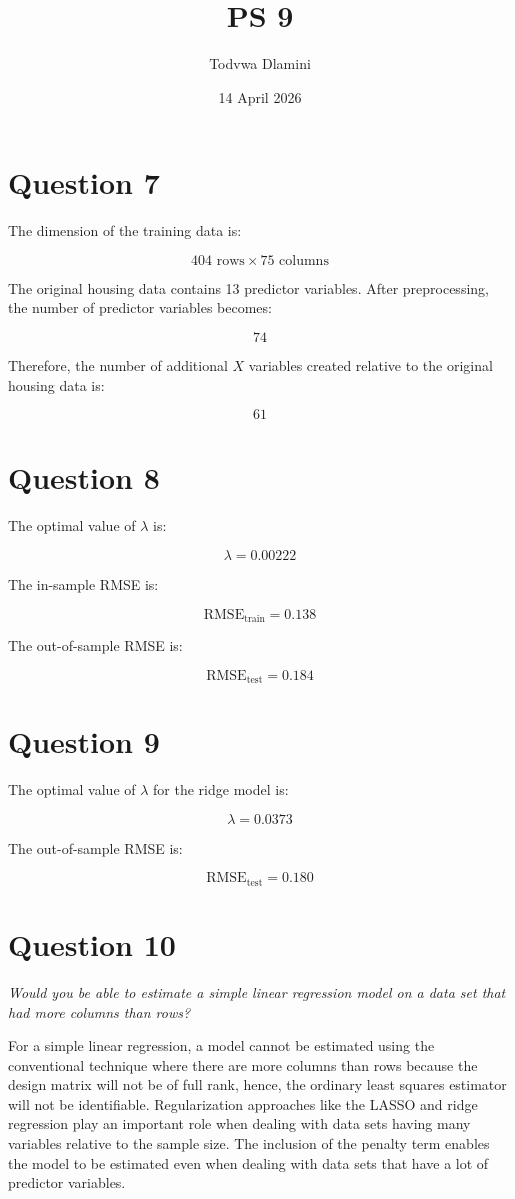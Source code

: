 \documentclass{article}
\title{PS 9}
\author{Todvwa Dlamini}
\date{14 April 2026}
\begin{document}
\maketitle

\section*{Question 7}

The dimension of the training data is:

\[
404 \text{ rows} \times 75 \text{ columns}
\]

The original housing data contains 13 predictor variables. After preprocessing, the number of predictor variables becomes:

\[
74
\]

Therefore, the number of additional $X$ variables created relative to the original housing data is:

\[
61
\]


\section*{Question 8}

The optimal value of $\lambda$ is:

\[
\lambda = 0.00222
\]

The in-sample RMSE is:

\[
\text{RMSE}_{\text{train}} = 0.138
\]

The out-of-sample RMSE is:

\[
\text{RMSE}_{\text{test}} = 0.184
\]


\section*{Question 9}

The optimal value of $\lambda$ for the ridge model is:

\[
\lambda = 0.0373
\]

The out-of-sample RMSE is:

\[
\text{RMSE}_{\text{test}} = 0.180
\]

\section*{Question 10}

\textit{Would you be able to estimate a simple linear regression model on a data set that had more columns than rows?}

\medskip
For a simple linear regression, a model cannot be estimated using the conventional technique where there are more columns than rows because the design matrix will not be of full rank, hence, the ordinary least squares estimator will not be identifiable. Regularization approaches like the LASSO and ridge regression play an important role when dealing with data sets having many variables relative to the sample size. The inclusion of the penalty term enables the model to be estimated even when dealing with data sets that have a lot of predictor variables.
\end{document}
